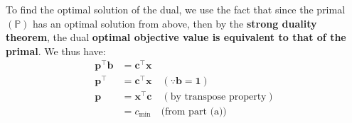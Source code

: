 \documentclass[12pt]{article}
\begin{document}
\noindent To find the optimal solution of the dual, we use the fact that since the primal $(\mathbb{P})$ has an optimal solution from above, then by the \textbf{strong duality theorem}, the dual \textbf{optimal objective value is equivalent to that of the primal}. We thus have: \begin{align*}
    \mathbf{p}^{\top}\mathbf{b} &= \mathbf{c}^{\top}\mathbf{x} \\ 
    \mathbf{p}^{\top} &= \mathbf{c}^{\top}\mathbf{x} \quad (\because \mathbf{b} = \mathbf{1})\\ 
    \mathbf{p} &= \mathbf{x}^{\top}\mathbf{c} \quad (\text{by transpose property})\\ 
    &= c_{\text{min}} \quad \text{(from part (a))}
\end{align*}
\end{document}
